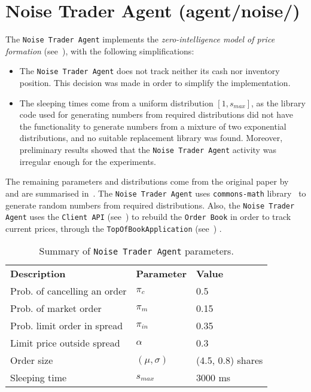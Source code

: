 \FloatBarrier
\section{Noise Trader Agent (agent/noise/)}
\label{Chapters/Implementation/Noise-Agent}

The \texttt{Noise Trader Agent} implements the \textit{zero-intelligence model of price formation} (see~), with the following simplifications:
\begin{itemize}
\item The \texttt{Noise Trader Agent} does not track neither its cash nor inventory position. This decision was made in order to simplify the implementation.
\item The sleeping times come from a uniform distribution $[1,s_{max}]$, as the library code used for generating numbers from required distributions did not have the functionality to generate numbers from a mixture of two exponential distributions, and no suitable replacement library was found. Moreover, preliminary results showed that the \texttt{Noise Trader Agent} activity was irregular enough for the experiments.
\end{itemize}

The remaining parameters and distributions come from the original paper by~\citet{Gilles2006} and are summarised in~. The \texttt{Noise Trader Agent} uses \texttt{commons-math} library~\cite{commons-math} to generate random numbers from required distributions. Also, the \texttt{Noise Trader Agent} uses the \texttt{Client API} (see~) to rebuild the \texttt{Order Book} in order to track current prices, through the \texttt{TopOfBookApplication} (see~) .

\begin{table}[h]
\begin{center}
\begin{tabular}{ l l l }
\textbf{Description} & \textbf{Parameter} & \textbf{Value} \\
\cmidrule(r){1-3}
Prob. of cancelling an order & $\pi_c$    		& 0.5                \\
Prob. of market order		 & $\pi_m$   		& 0.15               \\
Prob. limit order in spread  & $\pi_{in}$ 		& 0.35               \\ 
Limit price outside spread   & $\alpha$ 		& 0.3                \\
Order size					 & $(\mu, \sigma)$	& (4.5, 0.8) shares  \\
Sleeping time				 & $s_{max}$ & 3000 ms   \\
\end{tabular}
\end{center}
\caption{Summary of \texttt{Noise Trader Agent} parameters.}
\label{Table/Zero-Intelligence}
\end{table}